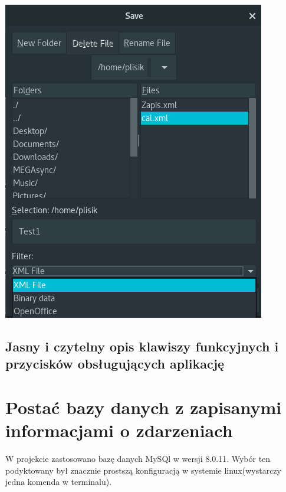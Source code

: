 \documentclass[a4paper,12pt]{article}
\begin{document}
\begin{minipage}{0.5\textwidth}

    \includegraphics[width=\textwidth]{./screen/AppScreen/SaveToAll.png}
    \label{MainViewLinux}

\end{minipage}

\subsection{Jasny i czytelny opis klawiszy funkcyjnych i przycisków obsługujących aplikację}
\section{Postać bazy danych z zapisanymi informacjami o zdarzeniach}
W projekcie zastosowano bazę danych MySQl w wersji 8.0.11. Wybór ten podyktowany był znacznie prostszą konfiguracją w systemie linux(wystarczy jedna komenda w terminalu).

\end{document}
